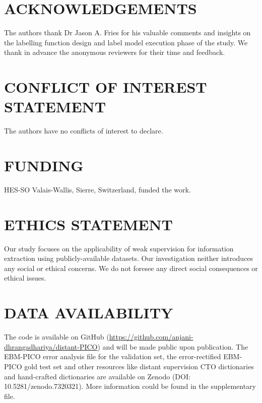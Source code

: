 \documentclass[10.7pt,]{article}
\begin{document}
\section{ACKNOWLEDGEMENTS}\label{acknowledgements}
%
The authors thank Dr Jason A. Fries for his valuable comments and insights on the labelling function design and label model execution phase of the study.
We thank in advance the anonymous reviewers for their time and feedback.
%
\section{CONFLICT OF INTEREST STATEMENT}\label{conflictinterest}
%
The authors have no conflicts of interest to declare. 
%
\section{FUNDING}\label{funding}
%
HES-SO Valais-Wallis, Sierre, Switzerland, funded the work.
%
\section{ETHICS STATEMENT}\label{ethic}
%
Our study focuses on the applicability of weak supervision for information extraction using publicly-available datasets.
Our investigation neither introduces any social or ethical concerns.
We do not foresee any direct social consequences or ethical issues.
%
%
%
%
\section{DATA AVAILABILITY}\label{abb}
%
The code is available on GitHub (\url{https://github.com/anjani-dhrangadhariya/distant-PICO}) and will be made public upon publication.
The EBM-PICO error analysis file for the validation set, the error-rectified EBM-PICO gold test set and other resources like distant supervision CTO dictionaries and hand-crafted dictionaries are available on Zenodo (DOI: 10.5281/zenodo.7320321). 
More information could be found in the supplementary file.
%
%
%
\printbibliography
%
%
%
%
%
\end{document}
